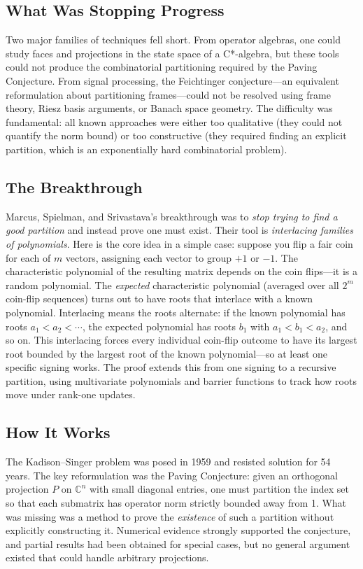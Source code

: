 \subsection{What Was Stopping Progress}
Two major families of techniques fell short. From operator algebras, one could study faces and projections in the state space of a C*-algebra, but these tools could not produce the combinatorial partitioning required by the Paving Conjecture. From signal processing, the Feichtinger conjecture---an equivalent reformulation about partitioning frames---could not be resolved using frame theory, Riesz basis arguments, or Banach space geometry. The difficulty was fundamental: all known approaches were either too qualitative (they could not quantify the norm bound) or too constructive (they required finding an explicit partition, which is an exponentially hard combinatorial problem).

\subsection{The Breakthrough}

Marcus, Spielman, and Srivastava's breakthrough was to \emph{stop trying to find a good partition} and instead prove one must exist. Their tool is \emph{interlacing families of polynomials}. Here is the core idea in a simple case: suppose you flip a fair coin for each of $m$ vectors, assigning each vector to group $+1$ or $-1$. The characteristic polynomial of the resulting matrix depends on the coin flips---it is a random polynomial. The \emph{expected} characteristic polynomial (averaged over all $2^m$ coin-flip sequences) turns out to have roots that interlace with a known polynomial. Interlacing means the roots alternate: if the known polynomial has roots $a_1 < a_2 < \cdots$, the expected polynomial has roots $b_1$ with $a_1 < b_1 < a_2$, and so on. This interlacing forces every individual coin-flip outcome to have its largest root bounded by the largest root of the known polynomial---so at least one specific signing works. The proof extends this from one signing to a recursive partition, using multivariate polynomials and barrier functions to track how roots move under rank-one updates.

\subsection{How It Works}

The Kadison--Singer problem was posed in 1959 and resisted solution for 54 years. The key reformulation was the Paving Conjecture: given an orthogonal projection $P$ on $\mathbb{C}^n$ with small diagonal entries, one must partition the index set so that each submatrix has operator norm strictly bounded away from 1. What was missing was a method to prove the \emph{existence} of such a partition without explicitly constructing it. Numerical evidence strongly supported the conjecture, and partial results had been obtained for special cases, but no general argument existed that could handle arbitrary projections.

